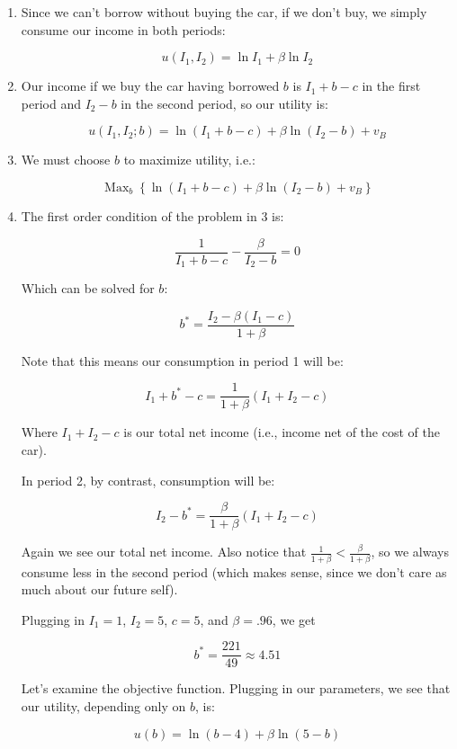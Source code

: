 \documentclass{article}
\newenvironment{solution}{\color{red}}{\color{black}}
\DeclareMathOperator*{\Max}{Max}
\begin{document}
\begin{solution}
\begin{enumerate}
\item Since we can't borrow without buying the car, if we don't buy, we simply consume our income in both periods:

\[ u(I_1, I_2) = \ln I_1 + \beta \ln I_2 \]

\item Our income if we buy the car having borrowed $b$ is $I_1 + b - c$ in the first period and $I_2 - b$ in the second period, so our utility is:

\[ u(I_1, I_2; b) = \ln \left(I_1 + b - c \right) + \beta \ln \left(I_2 - b \right) + v_B \]

\item We must choose $b$ to maximize utility, i.e.:

\[ \Max_{b} \left\{ \ln \left(I_1 + b - c \right) + \beta \ln \left(I_2 - b \right) + v_B \right\} \]

\item The first order condition of the problem in 3 is:

\[ \frac1{I_1 + b - c} - \frac\beta{I_2 - b} = 0 \]

Which can be solved for $b$:

\[ b^{*} = \frac{I_2 - \beta \left(I_1 - c \right)}{1 + \beta} \]

Note that this means our consumption in period 1 will be:

\[ I_1 + b^{*} -c = \frac1{1+\beta} \left(I_1 + I_2 - c \right) \]

Where $I_1 + I_2 - c$ is our total net income (i.e., income net of the cost of the car).

In period 2, by contrast, consumption will be:

\[ I_2 - b^{*} = \frac\beta{1+\beta} \left(I_1 + I_2 - c \right) \]

Again we see our total net income. Also notice that $\frac1{1+\beta} < \frac\beta{1+\beta}$, so we always consume less in the second period (which makes sense, since we don't care as much about our future self).

Plugging in $I_1 = 1$, $I_2 = 5$, $c = 5$, and $\beta = .96$, we get 

\[ b^{*} = \frac{221}{49} \approx 4.51 \]

Let's examine the objective function. Plugging in our parameters, we see that our utility, depending only on $b$, is:

\[ u(b) = \ln (b - 4) + \beta \ln (5 - b) \]


\end{enumerate}
\end{solution}
\end{document}
